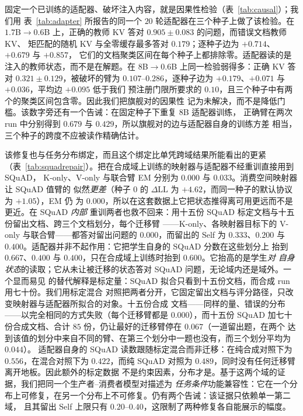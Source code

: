 \documentclass[11pt]{article}
\newcommand{\dll}{\Delta\text{LL}}
\begin{document}
固定一个已训练的适配器、破坏注入内容，就是因果性检验（表~\ref{tab:causal}）；我们用
表~\ref{tab:adapter} 所报告的同一个 $20$ 轮适配器在三个种子上做了该检验。在
$1.7$B$\to0.6$B 上，正确的教师 KV 答对 $0.905\pm0.083$ 的问题，而错误文档教师 KV、
矩匹配的随机 KV 与全零缓存最多答对 $0.179$；逐种子边为 $+0.714$、$+0.679$ 与 $+0.857$，
它们的文档聚类区间在每个种子上都排除零。适配器读的是注入的教师状态，而不是在解题。在
$8$B$\to0.6$B 上同一检验弱得多：正确 KV 答对 $0.321\pm0.129$，被破坏的臂为
$0.107$--$0.286$，逐种子边为 $+0.179$、$+0.071$ 与 $+0.036$，平均边 $+0.095$ 低于我们
预注册门限所要求的 $0.10$，且三个种子中有两个的聚类区间包含零。因此我们把旗舰对的因果性
记为未解决，而不是降低门槛。该数字旁还有一个告诫：在固定种子下重复 $8$B 适配器训练，
正确臂在两次 run 中分别得到 $0.679$ 与 $0.429$，所以旗舰对的边与适配器自身的训练方差
相当，三个种子的跨度不应被读作精确估计。

该修复也与任务分布绑定，而且这个绑定比单凭跨域结果所能看出的更紧
（表~\ref{tab:squadrepair}）。把在合成域上训练的映射器与适配器不经重训直接用到 SQuAD，
K-only、V-only 与联合臂 EM 分别为 $0.000$ 与 $0.033$。消费空间映射器让 SQuAD 值臂的
似然\emph{更差}（种子 0 的 $\dll$ 为 $+4.62$，而同一种子的默认协议为 $+1.05$），EM 仍
为 $0.000$，所以在这套数据上它把状态推得离可用更远而不是更近。在 SQuAD \emph{内部}
重训两者也救不回来：用十五份 SQuAD 标定文档与十五份留出文档、跨三个文档划分，每个迁移臂
——K-only、各映射器目标下的 V-only 与联合臂——都答对留出问题的 $0.000$，而留出的 Self 为
$0.333$、$0.200$ 与 $0.400$。适配器并非不起作用：它把学生自身的 SQuAD 分数在这些划分上
抬到 $0.667$、$0.400$ 与 $0.400$，只在合成域上训练时抬到 $0.600$。它抬高的是学生\emph{对
自身状态}的读取；它从未让被迁移的状态答对 SQuAD 问题，无论域内还是域外。一个显而易见
的替代解释是标定量：SQuAD 拟合只看到十五份文档，而合成 run 用七十份。我们用标定混合
对照把两者分开，它固定留出文档与评分路径，只改变映射器与适配器所拟合的对象。十五份合成
文档——同样的量、错误的分布——以完全相同的方式失败（每个迁移臂都是 $0.000$），而十五份
SQuAD 加七十份合成文档、合计 $85$ 份，仍让最好的迁移臂停在 $0.067$（一道留出题，在两个
达到该值的划分中来自不同的臂、在第三个划分中一题也没有，而三个划分平均为 $0.044$）。
适配器自身的 SQuAD 读数跟随标定混合而非迁移：在纯合成对照下为 $0.556$，在混合对照下为
$0.422$，而纯 SQuAD 对照为 $0.489$，同时没有任何迁移臂离开地板。因此额外的标定数据
不是约束因素，分布才是。基于这两个域的证据，我们把同一个生产者--消费者模型对描述为
\emph{任务条件}功能兼容性：它在一个分布上可修复，在另一个分布上不可修复。仍有两个告诫：该证据只依赖单一第二域，
且其留出 Self 上限只有 $0.20$--$0.40$，这限制了两种修复各自能展示的幅度。
\end{document}
